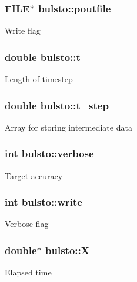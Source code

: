 \subsubsection[{poutfile}]{\setlength{\rightskip}{0pt plus 5cm}F\+I\+L\+E$\ast$ bulsto\+::poutfile}\label{structbulsto_a1bd09226c3efbaec4baa7915682b9c40}
Write flag \hypertarget{structbulsto_a3553c5b225bd39d4f8e797ea958f8b3b}{}
\subsubsection[{t}]{\setlength{\rightskip}{0pt plus 5cm}double bulsto\+::t}\label{structbulsto_a3553c5b225bd39d4f8e797ea958f8b3b}
Length of timestep \hypertarget{structbulsto_aa8ddc55838fa4eef090464cd6c523b1b}{}
\subsubsection[{t\+\_\+step}]{\setlength{\rightskip}{0pt plus 5cm}double bulsto\+::t\+\_\+step}\label{structbulsto_aa8ddc55838fa4eef090464cd6c523b1b}
Array for storing intermediate data \hypertarget{structbulsto_a21e52ecfd0e77ee341ec29e73e871be7}{}
\subsubsection[{verbose}]{\setlength{\rightskip}{0pt plus 5cm}int bulsto\+::verbose}\label{structbulsto_a21e52ecfd0e77ee341ec29e73e871be7}
Target accuracy \hypertarget{structbulsto_a79adff2fa017d5b62e46beebf5af387f}{}
\subsubsection[{write}]{\setlength{\rightskip}{0pt plus 5cm}int bulsto\+::write}\label{structbulsto_a79adff2fa017d5b62e46beebf5af387f}
Verbose flag \hypertarget{structbulsto_a110de2f76d66addd0c11b3c1cf896557}{}
\subsubsection[{X}]{\setlength{\rightskip}{0pt plus 5cm}double$\ast$ bulsto\+::\+X}\label{structbulsto_a110de2f76d66addd0c11b3c1cf896557}
Elapsed time \hypertarget{structbulsto_ae042d246b8cc4fc2dca7eeb2b7de41a0}{}
